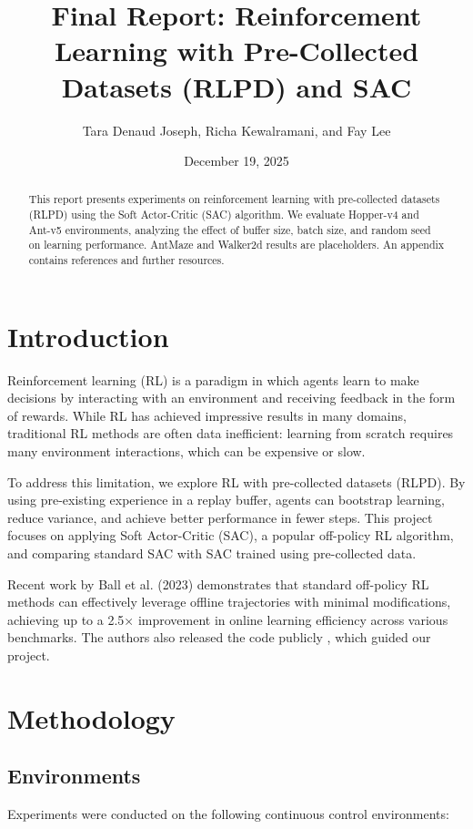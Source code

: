 \documentclass[12pt]{article}
\title{Final Report: Reinforcement Learning with Pre-Collected Datasets (RLPD) and SAC}
\author{Tara Denaud Joseph, Richa Kewalramani, and Fay Lee}
\date{December 19, 2025}
\begin{document}
\maketitle

\begin{abstract}
This report presents experiments on reinforcement learning with pre-collected datasets (RLPD) using the Soft Actor-Critic (SAC) algorithm. We evaluate Hopper-v4 and Ant-v5 environments, analyzing the effect of buffer size, batch size, and random seed on learning performance. AntMaze and Walker2d results are placeholders. An appendix contains references and further resources.
\end{abstract}

\section{Introduction}
Reinforcement learning (RL) is a paradigm in which agents learn to make decisions by interacting with an environment and receiving feedback in the form of rewards. While RL has achieved impressive results in many domains, traditional RL methods are often data inefficient: learning from scratch requires many environment interactions, which can be expensive or slow.

To address this limitation, we explore RL with pre-collected datasets (RLPD). By using pre-existing experience in a replay buffer, agents can bootstrap learning, reduce variance, and achieve better performance in fewer steps. This project focuses on applying Soft Actor-Critic (SAC), a popular off-policy RL algorithm, and comparing standard SAC with SAC trained using pre-collected data.

Recent work by Ball et al. (2023) demonstrates that standard off-policy RL methods can effectively leverage offline trajectories with minimal modifications, achieving up to a 2.5× improvement in online learning efficiency across various benchmarks. The authors also released the code publicly \cite{rlpd_github}, which guided our project.

\section{Methodology}

\subsection{Environments}
Experiments were conducted on the following continuous control environments:
\end{document}
